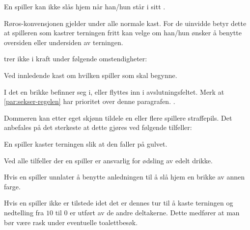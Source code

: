 \begin{ludol}
\item En spiller kan ikke slås hjem når han/hun står i sitt
  .

\item \label{par:roros} %
  Røros-konvensjonen gjelder under alle normale kast. For de uinvidde betyr
  dette at spilleren som kastrer terningen fritt kan velge om han/hun ønsker å
  benytte oversiden eller undersiden av terningen.


 \ifnothandbok{\newpage %
  \vspace*{-1.38cm}} 
  \thispagestyle{empty} %

\item \label{par:roros-2} %
   trer ikke i kraft under følgende omstendigheter:

  \begin{ludol}

  \item Ved innledende kast om hvilken spiller som skal begynne.

  \item I det en brikke befinner seg i, eller flyttes inn i avslutningsfeltet.
    Merk at \cref{par:sekser-regelen} har prioritet over denne paragrafen.
    .

  \end{ludol}

\item Dommeren kan etter eget skjønn tildele en eller flere spillere
  straffepils. Det anbefales på det sterkeste at dette gjøres ved følgende
  tilfeller:

  \begin{ludol}

  \item En spiller kaster terningen slik at den faller på gulvet.

  \item Ved alle tilfeller der en spiller er ansvarlig for ødsling av edelt
    drikke.

  \item Hvis en spiller unnlater å benytte anledningen til å slå hjem en brikke
    av annen farge.

  \item Hvis en spiller ikke er tilstede idet det er dennes tur til å kaste
    terningen og nedtelling fra $10$ til $0$ er utført av de andre deltakerne.
    Dette medfører at man bør være rask under eventuelle toalettbesøk.


\end{ludol}
\end{ludol}
